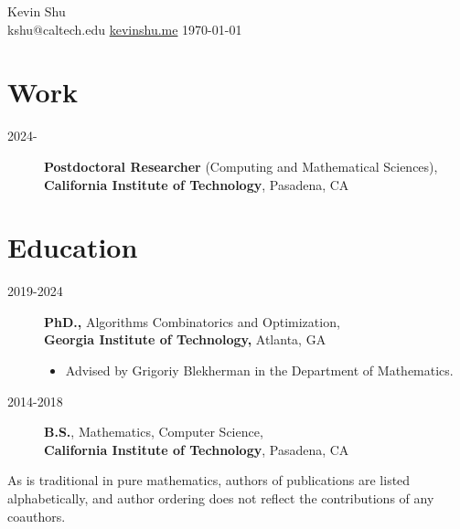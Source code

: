 \documentclass[10pt, letterpaper]{article}
\newenvironment{header}{
    \setlength{\topsep}{0pt}\par\kern\topsep\centering\linespread{1.5}
}{
    \par\kern\topsep
} %
\let\hrefWithoutArrow\href
\begin{document}
    \newcommand{\AND}{\unskip
        \cleaders\copy\ANDbox\hskip\wd\ANDbox
        \ignorespaces
    }
    \newsavebox\ANDbox
    \sbox\ANDbox{$|$}

    \begin{header}
        \fontsize{25 pt}{25 pt}\selectfont Kevin Shu\\
        \vspace{5 pt}
        \normalsize
        \mbox{kshu@caltech.edu} \hspace{5 pt}%
        \mbox{\hrefWithoutArrow{https://kevinshu.me}{kevinshu.me}} \hspace{5 pt}
        \mbox{\today}
    \end{header}
\section{Work}
\begin{description}
    \item[2024-\qquad] {\bf Postdoctoral Researcher} (Computing and Mathematical Sciences),\\ {\hspace{0.35in} \bf California Institute of Technology}, Pasadena, CA
\end{description}
\section{Education} 
\begin{description}
    \item[2019-2024] {\bf PhD.,} Algorithms Combinatorics and Optimization,\\
        \hspace{0.35in} {\bf Georgia Institute of Technology,} Atlanta, GA
 
 \begin{itemize} \itemsep -2pt  %
 \item Advised by Grigoriy Blekherman in the Department of Mathematics.
 \end{itemize}

    \item[2014-2018] {\bf B.S.}, Mathematics, Computer Science,
\\ \hspace{0.35in} {\bf California Institute of Technology}, Pasadena, CA
\end{description}

As is traditional in pure mathematics, authors of publications are listed alphabetically, and author ordering does not reflect the contributions of any coauthors.
\end{document}
